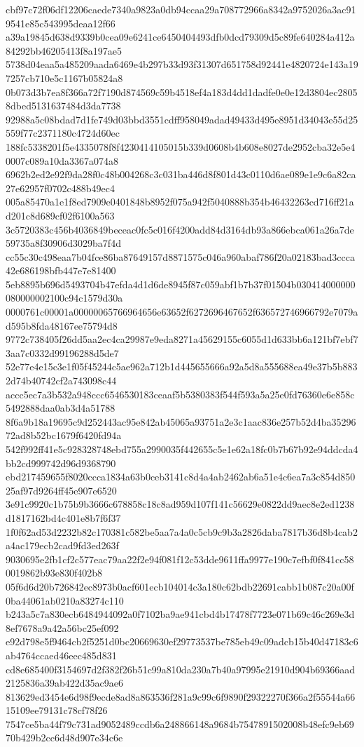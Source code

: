 {cbf97c72f06df12206caede7340a9823a0db94ccaa29a708772966a8342a9752026a3ac919541e85c543995deaa12f66
a39a19845d638d9339b0cea09e6241ce6450404493dfb0dcd79309d5c89fe640284a412a84292bb46205413f8a197ae5
5738d04eaa5a485209aada6469e4b297b33d93f31307d651758d92441e4820724e143a197257cb710e5c1167b05824a8
0b073d3b7ea8f366a72f7190d874569c59b4518ef4a183d4dd1dadfe0e0e12d3804ec28058dbed5131637484d3da7738
92988a5c08bdad7d1fe749d03bbd3551cdff958049adad49433d495e8951d34043e55d25559f77c2371180c4724d60ec
188fc5338201f5e4335078f8f4230414105015b339d0608b4b608e8027de2952cba32e5e40007c089a10da3367a074a8
6962b2ed2e92f9da28f0c48b004268c3c031ba446d8f801d43c0110d6ae089e1e9c6a82ca27e62957f0702c488b49ec4
005a85470a1e1f8ed7909e0401848b8952f075a942f5040888b354b46432263cd716ff21ad201c8d689cf02f6100a563
3c5720383c456b4036849beceac0fc5c016f4200add84d3164db93a866ebca061a26a7de59735a8f30906d3029ba7f4d
cc55c30c498eaa7b04fce86ba87649157d8871575c046a960abaf786f20a02183bad3ccca42e686198bfb447e7e81400
5eb8895b696d5493704b47efda4d1d6de8945f87c059abf1b7b37f01504b030414000000080000002100c94c1579d30a
0000761c00001a00000065766964656e63652f6272696467652f636572746966792e7079ad595b8fda48167ee75794d8
9772c738405f26dd5aa2ec4ca29987e9eda8271a45629155c6055d1d633bb6a121bf7ebf73aa7c0332d99196288d5de7
52e77e4e15c3e1f05f45244c5ae962a712b1d445655666a92a5d8a555688ea49e37b5b8832d74b40742cf2a743098c44
accc5ec7a3b532a948ccc6546530183ceaaf5b5380383f544f593a5a25e0fd76360e6e858c5492888daa0ab3d4a51788
8f6a9b18a19695c9d252443ac95e842ab45065a93751a2e3c1aac836e257b52d4ba3529672ad8b52bc1679f6420fd94a
542f992ff41e5c928328748ebd755a2990035f442655c5e1e62a18fc0b7b67b92e94ddcda4bb2cd999742d96d9368790
ebd217459655f8020ccca1834a63b0ceb3141c8d4a4ab2462ab6a51e4c6ea7a3c854d85025af97d9264ff45e907e6520
3e91c9920c1b75b9b3666c678858c18c8ad959d107f141c56629e0822dd9aec8e2ed1238d1817162bd4c401e8b7f6f37
1f0f62ad53d2232b82c170381c582be5aa7a4a0c5cb9c9b3a2826daba7817b36d8b4cab2a4ac179ecb2cad9fd3ed263f
9030695e2fb1cf2c577eac79aa22f2e94f081f12c53dde9611ffa9977e190c7efbf0f841cc580019862b93e830f402b8
05f6d6d20b726842ec8973b0acf601ecb104014c3a180c62bdb22691cabb1b087c20a00f0ba44061ab0210a83274c110
b243a5c7a830ecb6484944092a0f7102ba9ae941cbd4b17478f7723e071b69c46c269e3d8ef7678a9a42a56bc25ef092
e92d798e5f9464cb2f5251d0bc20669630ef29773537be785eb49c09adcb15b40d47183c6ab4764ccaed46eec485d831
cd8e685400f3154697d2f382f26b51c99a810da230a7b40a97995e21910d904b69366aad2125836a39ab422d35ac9ae6
813629ed3454e6d98f9ecde8ad8a863536f281a9c99c6f9890f29322270f366a2f55544a6615109ee79131c78cf78f26
7547ce5ba44f79c731ad9052489ccdb6a248866148a9684b7547891502008b48efc9eb6970b429b2cc6d48d907e34c6e
}
